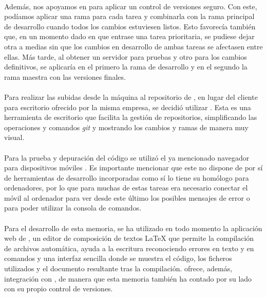 \documentclass{subfiles}
\begin{document}
        \paragraph{}
        Además, nos apoyamos en \github \cite{web:github} para aplicar un control de versiones seguro. Con este, podíamos aplicar una rama para cada tarea y combinarla con la rama principal de desarrollo cuando todos los cambios estuviesen listos. Esto favorecía también que, en un momento dado en que entrase una tarea prioritaria, se pudiese dejar otra a medias sin que los cambios en desarrollo de ambas tareas se afectasen entre ellas. Más tarde, al obtener un servidor para pruebas y otro para los cambios definitivos, se aplicaría en el primero la rama de desarrollo y en el segundo la rama maestra con las versiones finales.

        \paragraph{}
        Para realizar las subidas desde la máquina al repositorio de \github, en lugar del cliente para escritorio ofrecido por la misma empresa, se decidió utilizar \gitkraken \cite{web:gitkraken}. Esta es una herramienta de escritorio que facilita la gestión de repositorios, simplificando las operaciones y comandos \textit{git} y mostrando los cambios y ramas de manera muy visual.

        \paragraph{}
        Para la prueba y depuración del código se utilizó el ya mencionado navegador \googlechrome para dispositivos móviles \cite{web:googlechromeforandroid}. Es importante mencionar que este no dispone de por sí de herramientas de desarrollo incorporadas como sí lo tiene su homólogo para ordenadores, por lo que para muchas de estas tareas era necesario conectar el móvil al ordenador para ver desde este último los posibles mensajes de error o para poder utilizar la consola de comandos.

        \paragraph{}
        Para el desarrollo de esta memoria, se ha utilizado en todo momento la aplicación web de \overleaf \cite{web:overleaf}, un editor de composición de textos \LaTeX \xspace que permite la compilación de archivos automática, ayuda a la escritura reconociendo errores en texto y en comandos y una interfaz sencilla donde se muestra el código, los ficheros utilizados y el documento resultante tras la compilación. \overleaf ofrece, además, integración con \github, de manera que esta memoria también ha contado por su lado con su propio control de versiones.
\end{document}
